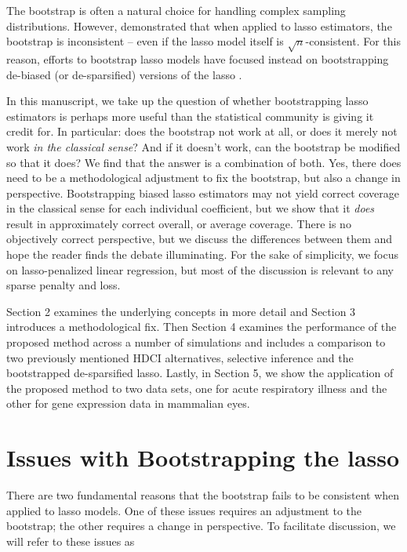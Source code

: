 The bootstrap is often a natural choice for handling complex sampling distributions. However, \cite{Chatterjee2010} demonstrated that when applied to lasso estimators, the bootstrap is inconsistent -- even if the lasso model itself is $\sqrt{n}$-consistent. For this reason, efforts to bootstrap lasso models have focused instead on bootstrapping de-biased (or de-sparsified) versions of the lasso \citep{Dezeure2017}.

In this manuscript, we take up the question of whether bootstrapping lasso estimators is perhaps more useful than the statistical community is giving it credit for. In particular: does the bootstrap not work at all, or does it merely not work \emph{in the classical sense}? And if it doesn't work, can the bootstrap be modified so that it does? We find that the answer is a combination of both. Yes, there does need to be a methodological adjustment to fix the bootstrap, but also a change in perspective. Bootstrapping biased lasso estimators may not yield correct coverage in the classical sense for each individual coefficient, but we show that it \emph{does} result in approximately correct overall, or average coverage. There is no objectively correct perspective, but we discuss the differences between them and hope the reader finds the debate illuminating. For the sake of simplicity, we focus on lasso-penalized linear regression, but most of the discussion is relevant to any sparse penalty and loss.

Section 2 examines the underlying concepts in more detail and Section 3 introduces a methodological fix. Then Section 4 examines the performance of the proposed method across a number of simulations and includes a comparison to two previously mentioned HDCI alternatives, selective inference and the bootstrapped de-sparsified lasso. Lastly, in Section 5, we show the application of the proposed method to two data sets, one for acute respiratory illness and the other for gene expression data in mammalian eyes.

\section{Issues with Bootstrapping the lasso}
\label{Sec:Difficulties}

There are two fundamental reasons that the bootstrap fails to be consistent when applied to lasso models. One of these issues requires an adjustment to the bootstrap; the other requires a change in perspective. To facilitate discussion, we will refer to these issues as

